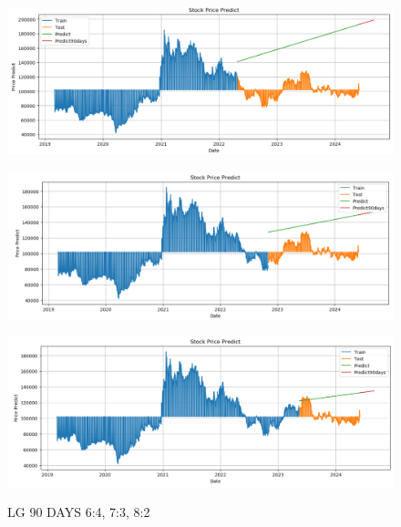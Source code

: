 \documentclass{article}
\begin{document}
\begin{multicols}{2}
\begin{figure}[H]
    \centering
    \begin{minipage}{0.15\textwidth}
    \centering
    \includegraphics[width=1\textwidth]{Image/Linear/Linear_LG_6_4_90DAYS.png}
   
    \label{fig:1}
    \end{minipage}%
    \begin{minipage}{0.15\textwidth}
    \centering
    \includegraphics[width=1\textwidth]{Image/Linear/Linear_LG_7_3_90DAYS.png}
  
    \label{fig:2}
    \end{minipage}%
    \begin{minipage}{0.15\textwidth}
    \centering
    \includegraphics[width=1\textwidth]{Image/Linear/Linear_LG_8_2_90DAYS.png}

    \label{fig:3}
    \end{minipage}
    \caption{LG 90 DAYS  6:4, 7:3, 8:2 }
\end{figure}


\end{multicols}
\end{document}

